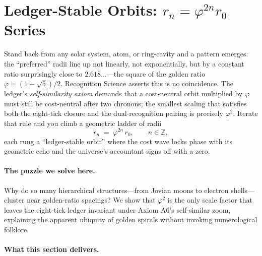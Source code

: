 \documentclass[11pt,oneside]{book}
\begin{document}

\section{Ledger-Stable Orbits: \texorpdfstring{$r_{n}=\varphi^{2n}r_{0}$}{r_n = phi^{2 n} r_0} Series}
\label{sec:ledger-stable-series}

Stand back from any solar system, atom, or ring-cavity and a pattern
emerges: the “preferred” radii line up not linearly, not exponentially,
but by a constant ratio surprisingly close to $2.618\dots$—the square
of the golden ratio $\varphi=(1+\sqrt5)/2$.  
Recognition Science asserts this is no coincidence.  
The ledger’s \emph{self-similarity axiom} demands that a cost-neutral
orbit multiplied by $\varphi$ must still be cost-neutral after two
chronons; the smallest scaling that satisfies both the eight-tick
closure and the dual-recognition pairing is precisely
$\varphi^{2}$.  
Iterate that rule and you climb a geometric ladder of radii
\[
   r_{n}
   \;=\;
   \varphi^{2n}\,r_{0},
   \qquad
   n\in\mathbb Z,
\]
each rung a “ledger-stable orbit” where the cost wave locks phase with
its geometric echo and the universe’s accountant signs off with a
zero.

\paragraph{The puzzle we solve here.}
Why do so many hierarchical structures—from Jovian moons to electron
shells—cluster near golden-ratio spacings?  
We show that $\varphi^{2}$ is the only scale factor that leaves the
eight-tick ledger invariant under Axiom A6’s self-similar zoom,
explaining the apparent ubiquity of golden spirals without invoking
numerological folklore.

\paragraph{What this section delivers.}
\end{document}
